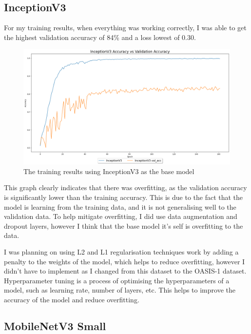 \documentclass[]{final_report}
\begin{document}
\subsection{InceptionV3}
For my training results, when everything was working correctly, I was able to get the highest validation accuracy of 84\% and a loss lowest of 0.30.
\begin{figure}[ht!]
  \centering
  \includegraphics[width=120mm]{images/inceptionv3-accuracy-vs-val-acc.png}
  \caption{The training results using InceptionV3\cite{DBLP:journals/corr/SzegedyVISW15} as the base model}
\end{figure}

This graph clearly indicates that there was overfitting, as the validation accuracy is significantly lower than the training accuracy.
This is due to the fact that the model is learning from the training data, and it is not generalising well to the validation data.
To help mitigate overfitting, I did use data augmentation and dropout layers, however I think that the base model it's self is overfitting to the data.

I was planning on using L2 and L1 regularisation techniques work by adding a penalty to the weights of the model, which helps to reduce overfitting, however I didn't have to implement as I changed from this dataset to the OASIS-1 dataset.
Hyperparameter tuning is a process of optimising the hyperparameters of a model, such as learning rate, number of layers, etc.
This helps to improve the accuracy of the model and reduce overfitting.


\pagebreak

\subsection{MobileNetV3 Small}
\end{document}
